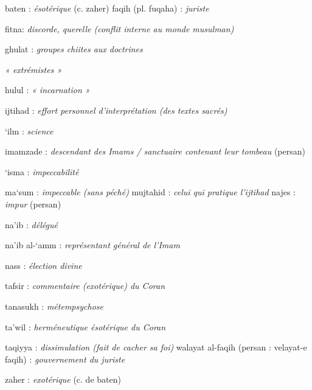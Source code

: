 baten : \emph{ésotérique} (c. zaher) faqih (pl. fuqaha) : \emph{juriste}

fitna: \emph{discorde, querelle (conflit interne au monde musulman)}

ghulat : \emph{groupes chiites aux doctrines}

\emph{« extrémistes »}

hulul : \emph{« incarnation »}

ijtihad : \emph{effort personnel d'interprétation (des textes sacrés)}

`ilm : \emph{science}

imamzade : \emph{descendant des Imams / sanctuaire contenant leur
tombeau} (persan)

`isma : \emph{impeccabilité}



ma`sum : \emph{impeccable (sans péché)} mujtahid : \emph{celui qui
pratique l'ijtihad} najes : \emph{impur} (persan)

na'ib : \emph{délégué}

na'ib al-`amm : \emph{représentant général de l'Imam}

nass : \emph{élection divine}

tafsir : \emph{commentaire (exotérique) du Coran}

tanasukh : \emph{métempsychose}

ta'wil : \emph{herméneutique ésotérique du Coran} 


taqiyya : \emph{dissimulation (fait de cacher sa foi)} walayat al-faqih
(persan : velayat-e faqih) : \emph{gouvernement du juriste}

zaher : \emph{exotérique} (c. de baten)
 
 


 



 


 